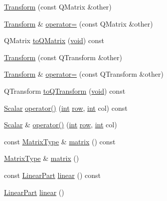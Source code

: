 \begin{DoxyCompactItemize}
\item 
\hyperlink{class_transform_a461a7d8091132a609cc3c7f4cff0761d}{Transform} (const Q\-Matrix \&other)
\item 
\hyperlink{class_transform}{Transform} \& \hyperlink{class_transform_a21410e56044710ca36f7b86af34c9954}{operator=} (const Q\-Matrix \&other)
\item 
Q\-Matrix \hyperlink{class_transform_a65647d52e3497c3e23f5304105551850}{to\-Q\-Matrix} (\hyperlink{group___u_a_v_objects_plugin_ga444cf2ff3f0ecbe028adce838d373f5c}{void}) const 
\item 
\hyperlink{class_transform_a5d1cf5d38541364669f90a147493ae6f}{Transform} (const Q\-Transform \&other)
\item 
\hyperlink{class_transform}{Transform} \& \hyperlink{class_transform_acc36fafcf915eabbd474f1c66578aba2}{operator=} (const Q\-Transform \&other)
\item 
Q\-Transform \hyperlink{class_transform_aa7ff23266e3d48481fa26a36554bbcdd}{to\-Q\-Transform} (\hyperlink{group___u_a_v_objects_plugin_ga444cf2ff3f0ecbe028adce838d373f5c}{void}) const 
\item 
\hyperlink{class_transform_a0468fefb805493a70f2100c7faf05489}{Scalar} \hyperlink{class_transform_ae27d807f0f6c8d972420b8c9ee70cf96}{operator()} (\hyperlink{ioapi_8h_a787fa3cf048117ba7123753c1e74fcd6}{int} \hyperlink{glext_8h_a11b277b422822f784ee248b43eee3e1e}{row}, \hyperlink{ioapi_8h_a787fa3cf048117ba7123753c1e74fcd6}{int} col) const 
\item 
\hyperlink{class_transform_a0468fefb805493a70f2100c7faf05489}{Scalar} \& \hyperlink{class_transform_a12ed116d315dafa282eb1fe5727e2602}{operator()} (\hyperlink{ioapi_8h_a787fa3cf048117ba7123753c1e74fcd6}{int} \hyperlink{glext_8h_a11b277b422822f784ee248b43eee3e1e}{row}, \hyperlink{ioapi_8h_a787fa3cf048117ba7123753c1e74fcd6}{int} col)
\item 
const \hyperlink{class_transform_afcdb9f1ab6b63ddfbc52789ef6319f33}{Matrix\-Type} \& \hyperlink{class_transform_a1530b18351df4dbea311856c36879af1}{matrix} () const 
\item 
\hyperlink{class_transform_afcdb9f1ab6b63ddfbc52789ef6319f33}{Matrix\-Type} \& \hyperlink{class_transform_ae71e6730a40ab692848b5fd94dd185e9}{matrix} ()
\item 
const \hyperlink{class_transform_adb8a1fb72e2dcea3ffc41f85e81552b6}{Linear\-Part} \hyperlink{class_transform_a4f2d70d651b1a1f2975d74576e944fc8}{linear} () const 
\item 
\hyperlink{class_transform_adb8a1fb72e2dcea3ffc41f85e81552b6}{Linear\-Part} \hyperlink{class_transform_a6a71f3dce0342c215394503aad486470}{linear} ()

\end{DoxyCompactItemize}
